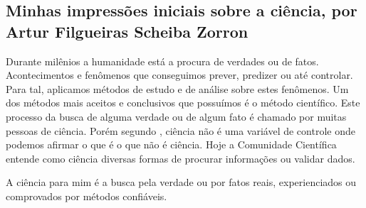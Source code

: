 \subsection{Minhas impressões iniciais sobre a ciência, por Artur Filgueiras Scheiba Zorron}

Durante milênios a humanidade está a procura de verdades ou de fatos. Acontecimentos e fenômenos que conseguimos prever, predizer ou até controlar. Para tal, aplicamos métodos de estudo e de análise sobre estes fenômenos. Um dos métodos mais aceitos e conclusivos que possuímos é o método científico. Este processo da busca de alguma verdade ou de algum fato é chamado por muitas pessoas de ciência. Porém segundo \citep{schwartzman_ciencia_1984}, ciência não é uma variável de controle onde podemos afirmar o que é o que não é ciência. Hoje a \gls{Comunidade Científica} entende como ciência diversas formas de procurar informações ou validar dados.

A ciência para mim é a busca pela verdade ou por fatos reais, experienciados ou comprovados por métodos confiáveis.